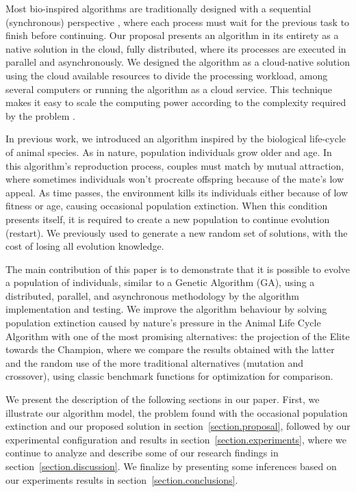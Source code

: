 \documentclass[graybox]{svmult}
\begin{document}
Most bio-inspired algorithms are traditionally designed with a sequential
(synchronous) perspective \cite{porto2018evolutionary,back1996evolutionary},
where each process must wait for the previous task to finish before continuing.
Our proposal presents an algorithm in its entirety as a native solution in the
cloud, fully distributed, where its processes are executed in parallel and
asynchronously. We designed the algorithm as a cloud-native solution using the
cloud available resources to divide the processing workload, among several
computers or running the algorithm as a cloud service. This technique makes it
easy to scale the computing power according to the complexity required by the
problem \cite{armbrust2010view}.

In previous work, we introduced an algorithm inspired by the biological
life-cycle of animal species. As in nature, population individuals grow older
and age. In this algorithm's reproduction process, couples must match by mutual
attraction, where sometimes individuals won't procreate offspring because of
the mate's low appeal. As time passes, the environment kills its individuals
either because of low fitness or age, causing occasional population extinction.
When this condition presents itself, it is required to create a new population
to continue evolution (restart). We previously used to generate a new random
set of solutions, with the cost of losing all evolution knowledge.

The main contribution of this paper is to demonstrate that it is possible to
evolve a population of individuals, similar to a Genetic Algorithm (GA), using
a distributed, parallel, and asynchronous methodology by the algorithm
implementation and testing. We improve the algorithm behaviour by solving
population extinction caused by nature's pressure in the Animal Life Cycle
Algorithm with one of the most promising alternatives: the projection of the
Elite towards the Champion, where we compare the results obtained with the
latter and the random use of the more traditional alternatives (mutation and
crossover), using classic benchmark functions for optimization for comparison.

We present the description of the following sections in our paper. First, we
illustrate our algorithm model, the problem found with the occasional
population extinction and our proposed solution in
section~\ref{section.proposal}, followed by our experimental configuration and
results in section~\ref{section.experiments}, where we continue to analyze and
describe some of our research findings in section~\ref{section.discussion}. We
finalize by presenting some inferences based on our experiments results in
section~\ref{section.conclusions}.
\end{document}
